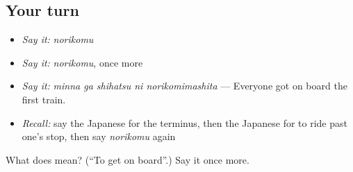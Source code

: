 \subsection*{Your turn}
\begin{itemize}
\raggedright
  \item \emph{Say it:} \emph{norikomu}
  \item \emph{Say it:} \emph{norikomu}, once more
  \item \emph{Say it:} \emph{minna ga shihatsu ni norikomimashita} — Everyone got on board the first train.
  \item \emph{Recall:} say the Japanese for the terminus, then the Japanese for to ride past one's stop, then say \emph{norikomu} again
\end{itemize}

\begin{tcolorbox}[breakable,colback=teal!4,colframe=teal!35!black,title={Before you move on}]
What does  mean? (\textquotedblleft{}To get on board\textquotedblright{}.) Say it once more.
\end{tcolorbox}
